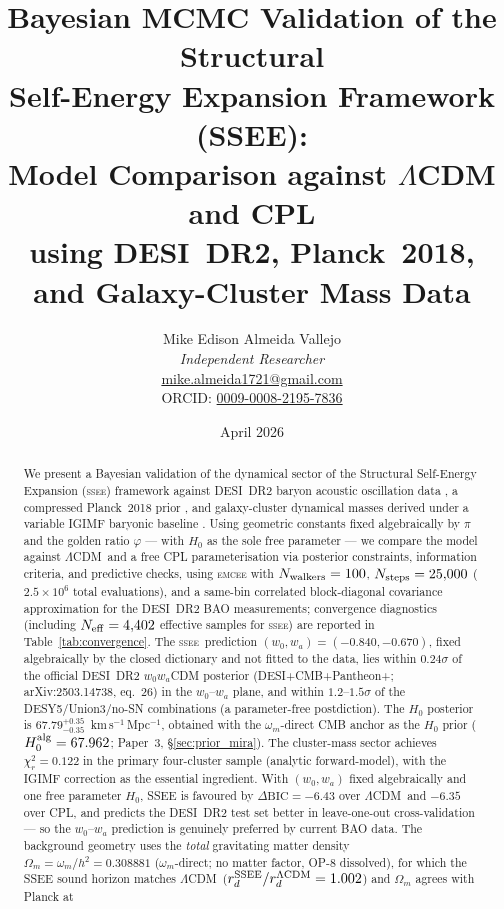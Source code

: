 \documentclass[12pt,a4paper]{article}
\title{\textbf{Bayesian MCMC Validation of the Structural\\
Self-Energy Expansion Framework (SSEE)}:\\[6pt]
\large Model Comparison against $\Lambda$CDM and CPL\\
using DESI~DR2, Planck~2018, and Galaxy-Cluster Mass Data}
\author{Mike Edison Almeida Vallejo \\
\small \textit{Independent Researcher} \\
\small \href{mailto:mike.almeida1721@gmail.com}{mike.almeida1721@gmail.com} \\
\small ORCID: \href{https://orcid.org/0009-0008-2195-7836}{0009-0008-2195-7836}
}
\date{April 2026}
\newcommand{\SSEE}{\ifmmode\mathrm{SSEE}\else\textsc{ssee}\fi}
\newcommand{\LCDM}{\ifmmode\Lambda\mathrm{CDM}\else$\Lambda$CDM\fi}
\newcommand{\wz}{w_0}
\newcommand{\wa}{w_a}
\newcommand{\HZeroPosterior}{67.79^{+0.35}_{-0.35}}
\begin{document}
\maketitle

\begin{abstract}
We present a Bayesian validation of the dynamical sector of the
Structural Self-Energy Expansion (\SSEE) framework
\citep{SSEE_paperI} against DESI~DR2 baryon acoustic oscillation data
\citep{DESI_DR2}, a compressed Planck~2018 prior \citep{Planck2018}, and
galaxy-cluster dynamical masses derived under a variable IGIMF baryonic
baseline \citep{Zhang2026}. Using geometric constants fixed algebraically
by $\pi$ and the golden ratio $\varphi$ — with $H_0$ as the sole free
parameter — we compare the model against \LCDM\ and a free CPL
parameterisation via posterior constraints, information criteria, and
predictive checks, using \textsc{emcee} \citep{emcee,GoodmanWeare2010} with $N_{\rm walkers}=100$,
$N_{\rm steps}=25{,}000$ ($2.5\times10^6$ total evaluations), and a same-bin correlated block-diagonal covariance approximation for the DESI~DR2 BAO measurements; convergence
diagnostics (including $N_{\rm eff}=4{,}402$ effective samples for \SSEE) are
reported in Table~\ref{tab:convergence}.
The \SSEE\ prediction $(\wz,\wa)=(-0.840,-0.670)$, fixed algebraically by the
closed dictionary \citep{AlmeidaSSEE2026genesis} and not fitted to the data,
lies within $0.24\sigma$ of the official DESI~DR2 $w_0w_a$CDM posterior
(DESI+CMB+Pantheon+; arXiv:2503.14738, eq.~26) in the $\wz$--$\wa$ plane, and
within $1.2$--$1.5\sigma$ of the DESY5/Union3/no-SN combinations
(a parameter-free postdiction).
The $H_0$ posterior is $\HZeroPosterior$~km\,s$^{-1}$\,Mpc$^{-1}$,
obtained with the $\omega_m$-direct CMB anchor as the $H_0$ prior
($H_0^{\rm alg}=67.962$; Paper~3, \S\ref{sec:prior_mira}).
The cluster-mass sector achieves $\chi^2_r=0.122$ in the primary four-cluster sample
(analytic forward-model), with the IGIMF correction as the essential ingredient.
With $(w_0,w_a)$ fixed algebraically and one free parameter $H_0$, SSEE is
favoured by $\Delta\mathrm{BIC}=-6.43$ over \LCDM\ and $-6.35$ over CPL, and
predicts the DESI~DR2 test set better in leave-one-out cross-validation ---
so the $\wz$--$\wa$ prediction is genuinely preferred by current BAO data.
The background geometry uses the \emph{total} gravitating matter density
$\Omega_m=\omega_m/h^2=0.308881$ ($\omega_m$-direct; no matter factor, OP-8
dissolved), for which the SSEE sound horizon matches \LCDM\
($r_d^{\SSEE}/r_d^{\LCDM}=1.002$) and $\Omega_m$ agrees with Planck at

\end{abstract}
\end{document}
